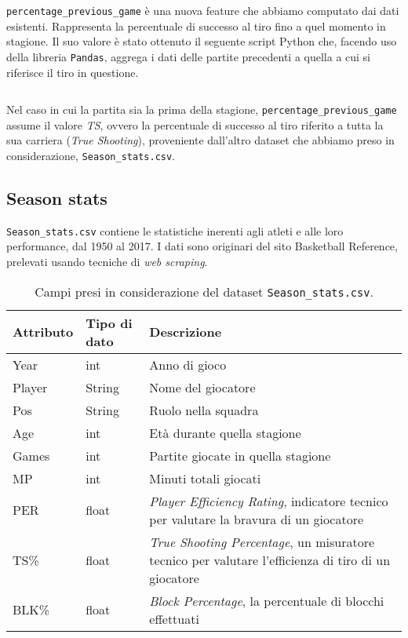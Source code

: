\texttt{percentage\_previous\_game} è una nuova feature che abbiamo computato dai dati esistenti. Rappresenta la percentuale di successo al tiro fino a quel momento in stagione. Il suo valore è stato ottenuto il seguente script Python che, facendo uso della libreria \texttt{Pandas}, aggrega i dati delle partite precedenti a quella a cui si riferisce il tiro in questione.

\begin{code}
\inputminted[breaklines]{python}{../datasets/shot_logs_nv.py}
\end{code}

Nel caso in cui la partita sia la prima della stagione, \texttt{percentage\_previous\_game} assume il valore \textit{TS}, ovvero la percentuale di successo al tiro riferito a tutta la sua carriera (\textit{True Shooting}), proveniente dall’altro dataset che abbiamo preso in considerazione, \texttt{Season\_stats.csv}.

\subsection{Season stats}

\texttt{Season\_stats.csv} \cite{season_stats} contiene le statistiche inerenti agli atleti e alle loro performance, dal 1950 al 2017. I dati sono originari del sito Basketball Reference, prelevati usando tecniche di \textit{web scraping}.

\begin{center}
	\begin{longtable}[m]{|m{5em} m{7em} m{16em}|} 

		\caption{Campi presi in considerazione del dataset \texttt{Season\_stats.csv}.\label{long}}\\
		\hline
		\bfseries{Attributo} & \bfseries{Tipo di dato} & \bfseries{Descrizione} \\
		\hline

		Year & int & Anno di gioco\\ 
		\hline
		Player & String & Nome del giocatore\\ 
		\hline
		Pos & String & Ruolo nella squadra\\ 
		\hline
		Age & int & Età durante quella stagione\\ 
		\hline
		Games & int & Partite giocate in quella stagione\\ 
		\hline
		MP & int & Minuti totali giocati\\ 
		\hline
		PER & float & \textit{Player Efficiency Rating}, indicatore tecnico per valutare la bravura di un giocatore \\ 
		\hline
		TS\% & float & \textit{True Shooting Percentage}, un misuratore tecnico per valutare l’efficienza di tiro di un giocatore  \\ 
		\hline
		BLK\% & float & \textit{Block Percentage}, la percentuale di blocchi effettuati \\ 
		\hline

	\end{longtable}
\end{center}

